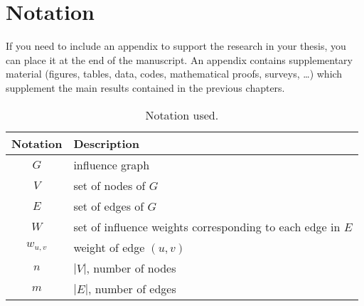 \chapter{Notation}
If you need to include an appendix to support the research in your thesis, you can place it at the end of the manuscript.
An appendix contains supplementary material (figures, tables, data, codes, mathematical proofs, surveys, \dots)
which supplement the main results contained in the previous chapters.

\begin{table}[H]
\centering
\begin{tabular}{c l} \hline
\textbf{Notation}&\textbf{Description} \\ \hline
$G$&influence graph\\
$V$&set of nodes of $G$\\
$E$&set of edges of $G$\\
$W$&set of influence weights corresponding to each edge in $E$\\
$w_{u,v}$&weight of edge $(u,v)$\\
$n$&$|V|$, number of nodes\\
$m$&$|E|$, number of edges\\
\hline
\end{tabular}
\caption{Notation used.}
\label{tab:thesis_notation}
\end{table}